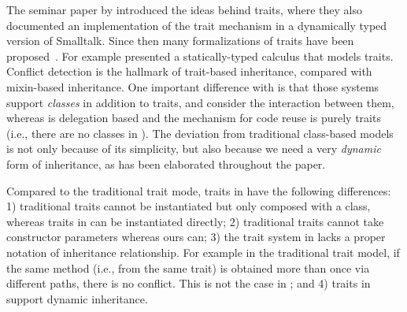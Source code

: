 The seminar paper by \citet{scharli2003traits} introduced the ideas behind
traits, where they also documented an implementation of the trait
mechanism in a dynamically typed version of Smalltalk. Since then many
formalizations of traits have been
proposed~\cite{scharli2003traitsformal,ducasse2006traits,bettini2010prototypical}.
For example \citet{fisher2004typed} presented a statically-typed calculus that
models traits. Conflict detection is the hallmark of trait-based
inheritance, compared with mixin-based inheritance. One important difference
with \name is that those systems support \textit{classes} in addition to traits,
and consider the interaction between them, whereas \name is 
delegation based and the mechanism for code reuse is purely traits
(i.e., there are no classes in \name). The
deviation from traditional class-based models is not only because of its
simplicity, but also because we need a very \textit{dynamic} form of
inheritance, as has been elaborated throughout the paper.

Compared to the traditional trait mode, traits in \name have the following
differences: 1) traditional traits cannot be instantiated but only composed with
a class, whereas traits in \name can be instantiated directly; 2) traditional
traits cannot take constructor parameters whereas ours can; 3) the trait system
in \name lacks a proper notation of inheritance relationship. For example in the
traditional trait model, if the same method (i.e., from the same trait) is
obtained more than once via different paths, there is no conflict. This is not
the case in \name; and 4) traits in \name support dynamic
inheritance. 






